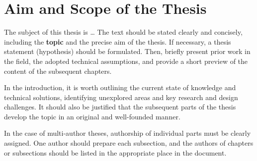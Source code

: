 \section{Aim and Scope of the Thesis}
The subject of this thesis is \dots \: The text should be stated clearly and concisely, including the \textbf{topic} and the precise aim of the thesis. If necessary, a thesis statement (hypothesis) should be formulated. Then, briefly present prior work in the field, the adopted technical assumptions, and provide a short preview of the content of the subsequent chapters.

In the introduction, it is worth outlining the current state of knowledge and technical solutions, identifying unexplored areas and key research and design challenges. It should also be justified that the subsequent parts of the thesis develop the topic in an original and well-founded manner.

In the case of multi-author theses, authorship of individual parts must be clearly assigned. One author should prepare each subsection, and the authors of chapters or subsections should be listed in the appropriate place in the document.
